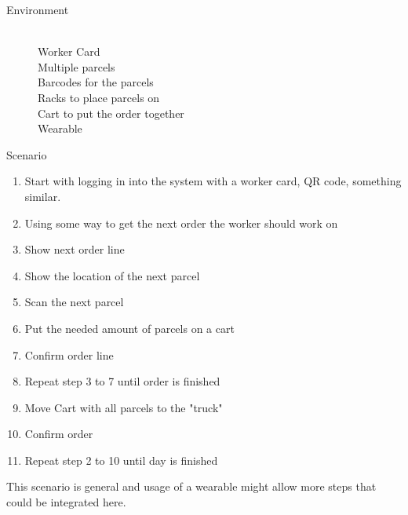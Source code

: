 \documentclass[a4paper]{report}
\begin{document}
\begin{description}
	\item[Environment] \hfill \\
	Worker Card \\
	Multiple parcels \\
	Barcodes for the parcels \\
	Racks to place parcels on \\
	Cart to put the order together \\
	Wearable
	\item[Scenario]
\end{description}
\begin{enumerate}
	\item Start with logging in into the system with a worker card, QR code, something similar.
	\item Using some way to get the next order the worker should work on
	\item Show next order line
	\item Show the location of the next parcel 
	\item Scan the next parcel
	\item Put the needed amount of parcels on a cart 
	\item Confirm order line 
	\item Repeat step 3 to 7 until order is finished 
	\item Move Cart with all parcels to the "truck" 
	\item Confirm order 
	\item Repeat step 2 to 10 until day is finished
\end{enumerate}
This scenario is general and usage of a wearable might allow more steps that could be integrated here.
\cleardoublepage
\end{document}
